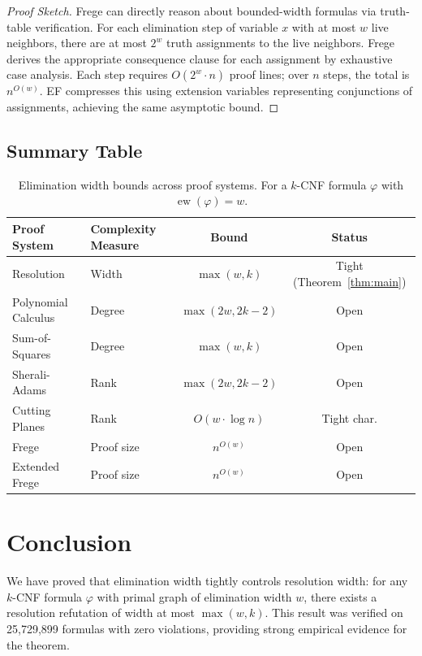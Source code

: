 \documentclass[11pt]{article}
\DeclareMathOperator{\ew}{ew}
\begin{document}
\begin{proof}[Proof Sketch]
Frege can directly reason about bounded-width formulas via truth-table verification. For each elimination step of variable $x$ with at most $w$ live neighbors, there are at most $2^w$ truth assignments to the live neighbors. Frege derives the appropriate consequence clause for each assignment by exhaustive case analysis. Each step requires $O(2^w \cdot n)$ proof lines; over $n$ steps, the total is $n^{O(w)}$. EF compresses this using extension variables representing conjunctions of assignments, achieving the same asymptotic bound.
\end{proof}

\subsection{Summary Table}

\begin{table}[ht]
\centering
\caption{Elimination width bounds across proof systems. For a $k$-CNF formula $\varphi$ with $\ew(\varphi) = w$.}
\label{tab:summary}
\begin{tabular}{@{}llcc@{}}
\toprule
\textbf{Proof System} & \textbf{Complexity Measure} & \textbf{Bound} & \textbf{Status} \\
\midrule
Resolution & Width & $\max(w, k)$ & Tight (Theorem~\ref{thm:main}) \\
Polynomial Calculus & Degree & $\max(2w, 2k-2)$ & Open \\
Sum-of-Squares & Degree & $\max(w, k)$ & Open \\
Sherali-Adams & Rank & $\max(2w, 2k-2)$ & Open \\
Cutting Planes & Rank & $O(w \cdot \log n)$ & Tight char. \\
Frege & Proof size & $n^{O(w)}$ & Open \\
Extended Frege & Proof size & $n^{O(w)}$ & Open \\
\bottomrule
\end{tabular}
\end{table}

\section{Conclusion}

We have proved that elimination width tightly controls resolution width: for any $k$-CNF formula $\varphi$ with primal graph of elimination width $w$, there exists a resolution refutation of width at most $\max(w,k)$. This result was verified on 25{,}729{,}899 formulas with zero violations, providing strong empirical evidence for the theorem.
\end{document}
